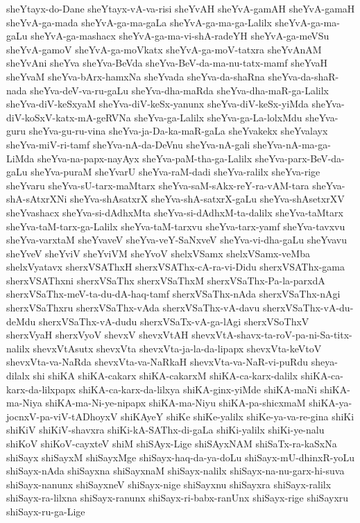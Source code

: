 {sheYtayx-do-Dane
sheYtayx-vA-va-risi
sheYvAH
sheYvA-gamAH
sheYvA-gamaH
sheYvA-ga-mada
sheYvA-ga-ma-gaLa
sheYvA-ga-ma-ga-Lalilx
sheYvA-ga-ma-gaLu
sheYvA-ga-mashacx
sheYvA-ga-ma-vi-shA-radeYH
sheYvA-ga-meVSu
sheYvA-gamoV
sheYvA-ga-moVkatx
sheYvA-ga-moV-tatxra
sheYvAnAM
sheYvAni
sheYva
sheYva-BeVda
sheYva-BeV-da-ma-nu-tatx-mamf
sheYvaH
sheYvaM
sheYva-bArx-hamxNa
sheYvada
sheYva-da-shaRna
sheYva-da-shaR-nada
sheYva-deV-va-ru-gaLu
sheYva-dha-maRda
sheYva-dha-maR-ga-Lalilx
sheYva-diV-keSxyaM
sheYva-diV-keSx-yanunx
sheYva-diV-keSx-yiMda
sheYva-diV-koSxV-katx-mA-geRVNa
sheYva-ga-Lalilx
sheYva-ga-La-lolxMdu
sheYva-guru
sheYva-gu-ru-vina
sheYva-ja-Da-ka-maR-gaLa
sheYvakekx
sheYvalayx
sheYva-miV-ri-tamf
sheYva-nA-da-DeVnu
sheYva-nA-gali
sheYva-nA-ma-ga-LiMda
sheYva-na-papx-nayAyx
sheYva-paM-tha-ga-Lalilx
sheYva-parx-BeV-da-gaLu
sheYva-puraM
sheYvarU
sheYva-raM-dadi
sheYva-ralilx
sheYva-rige
sheYvaru
sheYva-sU-tarx-maMtarx
sheYva-saM-sAkx-reY-ra-vAM-tara
sheYva-shA-sAtxrXNi
sheYva-shAsatxrX
sheYva-shA-satxrX-gaLu
sheYva-shAsetxrXV
sheYvashacx
sheYva-si-dAdhxMta
sheYva-si-dAdhxM-ta-dalilx
sheYva-taMtarx
sheYva-taM-tarx-ga-Lalilx
sheYva-taM-tarxvu
sheYva-tarx-yamf
sheYva-tavxvu
sheYva-varxtaM
sheYvaveV
sheYva-veY-SaNxveV
sheYva-vi-dha-gaLu
sheYvavu
sheYveV
sheYviV
sheYviVM
sheYvoV
shelxVSamx
shelxVSamx-veMba
shelxVyatavx
sherxVSAThxH
sherxVSAThx-cA-ra-vi-Didu
sherxVSAThx-gama
sherxVSAThxni
sherxVSaThx
sherxVSaThxM
sherxVSaThx-Pa-la-parxdA
sherxVSaThx-meV-ta-du-dA-haq-tamf
sherxVSaThx-nAda
sherxVSaThx-nAgi
sherxVSaThxru
sherxVSaThx-vAda
sherxVSaThx-vA-davu
sherxVSaThx-vA-du-deMdu
sherxVSaThx-vA-dudu
sherxVSaTx-vA-ga-lAgi
sherxVSoThxV
sherxVyaH
sherxVyoV
shevxV
shevxVtAH
shevxVtA-shavx-ta-roV-pa-ni-Sa-titx-nalilx
shevxVtAsutx
shevxVta
shevxVta-ja-la-da-lipapx
shevxVta-keVtoV
shevxVta-va-NaRda
shevxVta-va-NaRkaH
shevxVta-va-NaR-vi-puRdu
sheya-dilalx
shi
shiKA
shiKA-cakarx
shiKA-cakarxM
shiKA-ca-karx-dalilx
shiKA-ca-karx-da-lilxpapx
shiKA-ca-karx-da-lilxya
shiKA-ginx-yiMde
shiKA-maNi
shiKA-ma-Niya
shiKA-ma-Ni-ye-nipapx
shiKA-ma-Niyu
shiKA-pa-shicxmaM
shiKA-ya-jocnxV-pa-viV-tADhoyxV
shiKAyeY
shiKe
shiKe-yalilx
shiKe-ya-va-re-gina
shiKi
shiKiV
shiKiV-shavxra
shiKi-kA-SAThx-di-gaLa
shiKi-yalilx
shiKi-ye-nalu
shiKoV
shiKoV-cayxteV
shiM
shiSAyx-Lige
shiSAyxNAM
shiSaTx-ra-kaSxNa
shiSayx
shiSayxM
shiSayxMge
shiSayx-haq-da-ya-doLu
shiSayx-mU-dhinxR-yoLu
shiSayx-nAda
shiSayxna
shiSayxnaM
shiSayx-nalilx
shiSayx-na-nu-garx-hi-suva
shiSayx-nanunx
shiSayxneV
shiSayx-nige
shiSayxnu
shiSayxra
shiSayx-ralilx
shiSayx-ra-lilxna
shiSayx-ranunx
shiSayx-ri-babx-ranUnx
shiSayx-rige
shiSayxru
shiSayx-ru-ga-Lige
}
